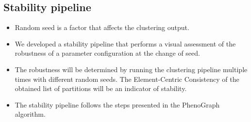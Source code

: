 \subsection{Stability pipeline}

\begin{frame}
    \begin{itemize}
        \item Random seed is a factor that affects the clustering output.
        \item We developed a stability pipeline that performs a visual assessment of the robustness of a parameter configuration at the change of seed.
        \item The robustness will be determined by running the clustering pipeline multiple times with different random seeds. The Element-Centric Consistency of the obtained list of partitions will be an indicator of stability.
        \item The stability pipeline follows the steps presented in the PhenoGraph algorithm.
    \end{itemize}
\end{frame}

